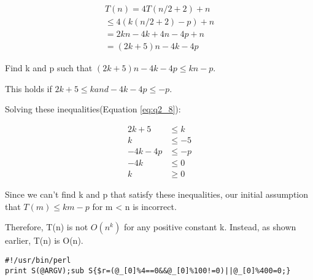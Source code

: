\documentclass{article}
\begin{document}
  \begin{equation}
    \begin{aligned}
      T(n) = 4T(n/2 + 2) + n \\
        \leq  4(k(n/2 + 2) - p) + n \\
        = 2kn - 4k + 4n - 4p + n \\
        = (2k + 5)n - 4k - 4p
    \end{aligned}
    \label{eq:q2_7}
  \end{equation}

  Find k and p such that $(2k + 5)n - 4k - 4p \leq  kn - p$.
  
  This holds if $2k + 5 \leq k and -4k - 4p \leq -p$.
  
  Solving these inequalities(Equation \eqref{eq:q2_8}):

  \begin{equation}
    \begin{aligned}
      2k + 5 &\leq k \\
      k &\leq -5 \\
      -4k - 4p &\leq -p \\
      -4k &\leq 0\\
      k &\geq  0
    \end{aligned}
    \label{eq:q2_8}
  \end{equation}

  Since we can't find k and p that satisfy these inequalities, our initial assumption that $ T(m) \leq km - p$ for m < n is incorrect.

  Therefore, T(n) is not $O(n^k)$ for any positive constant k. Instead, as shown earlier, T(n) is O(n).
  
  \begin{lstlisting}
#!/usr/bin/perl
print S(@ARGV);sub S{$r=(@_[0]%4==0&&@_[0]%100!=0)||@_[0]%400=0;}
  \end{lstlisting}
\end{document}
